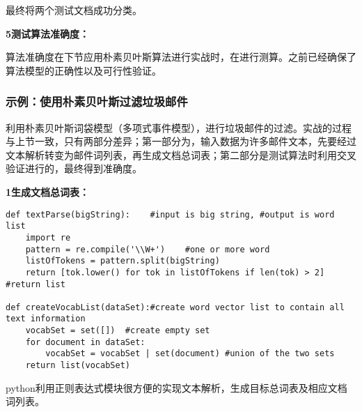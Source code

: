 最终将两个测试文档成功分类。

\noindent\textbf{\textcircled{\footnotesize{5}}测试算法准确度：}

算法准确度在下节应用朴素贝叶斯算法进行实战时，在进行测算。之前已经确保了算法模型的正确性以及可行性验证。

\subsubsection{示例：使用朴素贝叶斯过滤垃圾邮件}
利用朴素贝叶斯词袋模型（多项式事件模型），进行垃圾邮件的过滤。实战的过程与上节一致，只有两部分差异；第一部分为，输入数据为许多邮件文本，先要经过文本解析转变为邮件词列表，再生成文档总词表；第二部分是测试算法时利用交叉验证进行的，最终得到准确度。

\noindent\textbf{\textcircled{\footnotesize{1}}生成文档总词表： }
\begin{lstlisting}
def textParse(bigString):    #input is big string, #output is word list
    import re
    pattern = re.compile('\\W+')    #one or more word
    listOfTokens = pattern.split(bigString)
    return [tok.lower() for tok in listOfTokens if len(tok) > 2]  #return list

def createVocabList(dataSet):#create word vector list to contain all text information
    vocabSet = set([])  #create empty set
    for document in dataSet:
        vocabSet = vocabSet | set(document) #union of the two sets
    return list(vocabSet)
\end{lstlisting}

python利用正则表达式模块很方便的实现文本解析，生成目标总词表及相应文档词列表。

